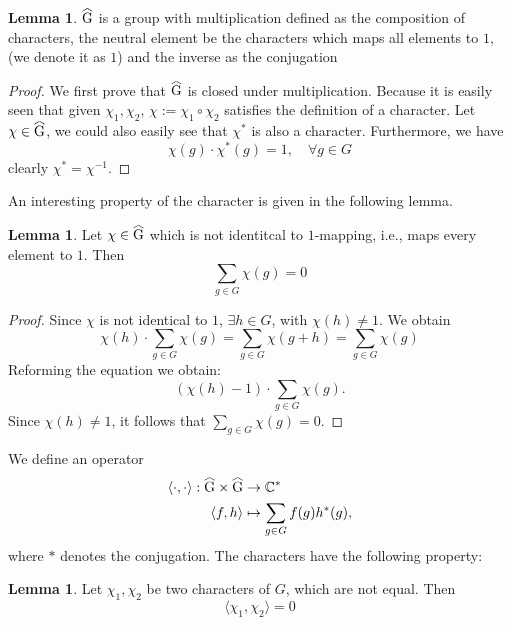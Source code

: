 \documentclass[12pt]{article}
\theoremstyle{definition}
\newtheorem{lemma}[theorem]{Lemma}
\numberwithin{equation}{theorem}
\numberwithin{figure}{theorem}
\newcommand\reallywidehat[1]{%
\savestack{\tmpbox}{\stretchto{%
  \scaleto{%
    \scalerel*[\widthof{\ensuremath{#1}}]{\kern-.6pt\bigwedge\kern-.6pt}%
    {\rule[-\textheight/2]{1ex}{\textheight}}%
  }{\textheight}%
}{0.5ex}}%
\stackon[1pt]{#1}{\tmpbox}%
}
\newcommand{\ComplexUnit}{\ensuremath{\mathbb{C}^{*}}}
\newcommand{\characterGroup}[1][G]{\ensuremath{\reallywidehat{#1}}}
\newcommand{\bilinearForm}[2]{\ensuremath{\langle#1,#2\rangle}}
\newcommand{\composition}[2]{\ensuremath{#1\circ#2}}
\begin{document}
    \begin{lemma}\label{lem:characterGroupIsAGroup}
        $\characterGroup$ is a group with multiplication defined as the composition of characters, the neutral element
        be the characters which maps all elements to $1$, (we denote it as $1$) and the inverse as the conjugation
    \end{lemma}
    \begin{proof}
        We first prove that $\characterGroup$ is closed under multiplication. Because it is easily seen that 
        given $\chi_1, \chi_2$, $\chi := \composition{\chi_1}{\chi_2}$ satisfies the definition of a character.
        Let $\chi \in \characterGroup$, we could also easily see that $\chi^{*}$ is also a character.
        Furthermore, we have 
        \[\chi(g) \cdot \chi^{*}(g) = 1, \quad \forall g \in G\]
        clearly $\chi^{*} = \chi^{-1}$.
    \end{proof}
    An interesting property of the character is given in the following lemma.
    \begin{lemma}\label{lem:character_1st_Property}
        Let $\chi \in \characterGroup$ which is not identitcal to $1$-mapping, i.e., maps every element to $1$.
        Then
        \[\sum_{g \in G} \chi(g) = 0\]
    \end{lemma}
    \begin{proof}
        Since $\chi$ is not identical to $1$, $\exists h \in G$, with $\chi(h) \neq 1$. We obtain
        \[\chi(h) \cdot \sum_{g\in G}\chi(g) = \sum_{g \in G} \chi(g + h) = \sum_{g \in G} \chi (g)\]
        Reforming the equation we obtain:
        \[(\chi(h) - 1) \cdot \sum_{g \in G} \chi(g).\]
        Since $\chi(h) \neq 1$, it follows that $\sum_{g \in G} \chi(g) = 0$.
    \end{proof}
    We define an operator 
    \begin{align*}
    \bilinearForm{\cdot}{\cdot}: \characterGroup \times \characterGroup &\rightarrow \ComplexUnit\\
    \bilinearForm{f}{h} &\mapsto \sum_{g\in G} f(g) h^{*}(g),
    \end{align*}
    where $*$ denotes the conjugation.
    The characters have the following property:
    \begin{lemma}\label{lem:character_2nd_Sum_Property}
        Let $\chi_1,\chi_2$ be two characters of $G$, which are not equal. Then
        \[\bilinearForm{\chi_1}{\chi_2} = 0\]
    \end{lemma}
\end{document}
